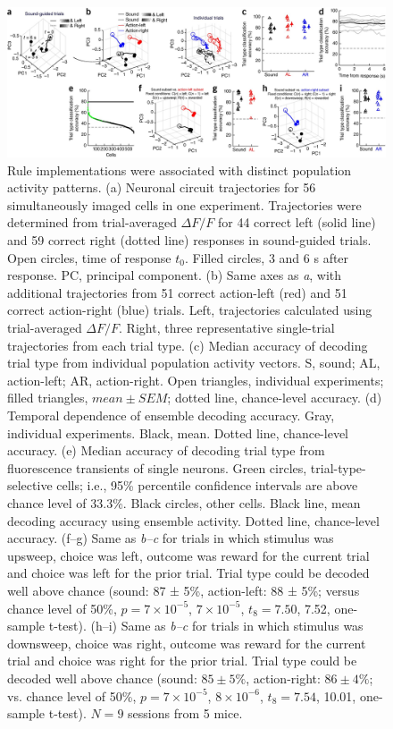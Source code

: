 \begin{figure}[htbp]

\begin{center}
\includegraphics[width=\textwidth]{Figures/Chapter3/NN_fig5} 
\end{center}

\caption[Rule implementations were associated with distinct population activity patterns]
{
Rule implementations were associated with distinct population activity patterns.
(a) Neuronal circuit trajectories for 56 simultaneously imaged cells in one experiment. Trajectories were determined from trial-averaged $\Delta F/F$ for 44 correct left (solid line) and 59 correct right (dotted line) responses in sound-guided trials. Open circles, time of response $t_0$. Filled circles, 3 and 6 s after response. PC, principal component. (b) Same axes as \emph{a}, with additional trajectories from 51 correct action-left (red) and 51 correct action-right (blue) trials. Left, trajectories calculated using trial-averaged $\Delta F/F$. Right, three representative single-trial trajectories from each trial type. (c) Median accuracy of decoding trial type from individual population activity vectors. S, sound; AL, action-left; AR, action-right. Open triangles, individual experiments; filled triangles, $\mathit{mean}\pm\mathit{SEM}$; dotted line, chance-level accuracy. (d) Temporal dependence of ensemble decoding accuracy. Gray, individual experiments. Black, mean. Dotted line, chance-level accuracy. (e) Median accuracy of decoding trial type from fluorescence transients of single neurons. Green circles, trial-type-selective cells; i.e., 95\% percentile confidence intervals are above chance level of 33.3\%. Black circles, other cells. Black line, mean decoding accuracy using ensemble activity. Dotted line, chance-level accuracy. (f--g) Same as \emph{b--c} for trials in which stimulus was upsweep, choice was left, outcome was reward for the current trial and choice was left for the prior trial. Trial type could be decoded well above chance (sound: 87 ± 5\%, action-left: 88 ± 5\%; versus chance level of 50\%, $p = 7 \times 10^{-5}$, $7 \times 10^{-5}$, $t_8 = 7.50$, 7.52, one-sample t-test). (h--i) Same as \emph{b--c} for trials in which stimulus was downsweep, choice was right, outcome was reward for the current trial and choice was right for the prior trial. Trial type could be decoded well above chance (sound: $85 \pm 5\%$, action-right: $86 \pm 4\%$; vs. chance level of 50\%, $p = 7 \times 10^{-5}$, $8 \times 10^{-6}$, $t_8 = 7.54$, 10.01, one-sample t-test). $N = 9$ sessions from 5 mice.
}

\label{fig:NN_fig5}
\end{figure}